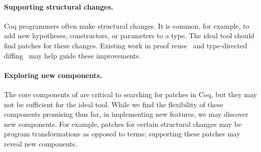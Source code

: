


\paragraph{Supporting structural changes.} Coq programmers often
make structural changes. It is common, for example, to
add new hypotheses, constructors, or parameters to a type.
The ideal tool should find patches for
these changes. %
Existing work in proof reuse~\cite{Boite2004, Mulhern06proofweaving}
and type-directed diffing~\cite{Miraldo:2017:TDS:3122975.3122976} may help guide these improvements.

\paragraph{Exploring new components.} The core components of \sysname are critical to searching for patches
in Coq, but they may not be sufficient for the ideal tool. While we find the flexibility of these components promising thus far, in implementing new features, we may discover new components. For example, patches for certain structural changes
may be program transformations as opposed to terms;
supporting these patches may reveal new components.

